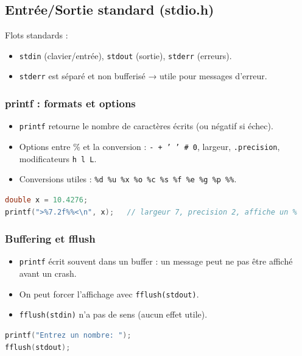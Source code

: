 \subsection{Entrée/Sortie standard (stdio.h)}
Flots standards :
\begin{itemize}
  \item \texttt{stdin} (clavier/entrée), \texttt{stdout} (sortie), \texttt{stderr} (erreurs).
  \item \texttt{stderr} est séparé et non bufferisé → utile pour messages d’erreur. 
\end{itemize}

\subsubsection{printf : formats et options}
\begin{itemize}
  \item \texttt{printf} retourne le nombre de caractères écrits (ou négatif si échec). 
  \item Options entre \% et la conversion : \texttt{- + ' ' \# 0}, largeur, \texttt{.precision}, modificateurs \texttt{h l L}.
  \item Conversions utiles : \texttt{\%d \%u \%x \%o \%c \%s \%f \%e \%g \%p \%\%}.
\end{itemize}

\begin{lstlisting}[language=C]
double x = 10.4276;
printf(">%7.2f%%<\n", x);   // largeur 7, precision 2, affiche un %
\end{lstlisting}

\subsubsection{Buffering et fflush}
\begin{itemize}
  \item \texttt{printf} écrit souvent dans un buffer : un message peut ne pas être affiché avant un crash.
  \item On peut forcer l’affichage avec \texttt{fflush(stdout)}. 
  \item \texttt{fflush(stdin)} n’a pas de sens (aucun effet utile).
\end{itemize}

\begin{lstlisting}[language=C]
printf("Entrez un nombre: ");
fflush(stdout);
\end{lstlisting}

